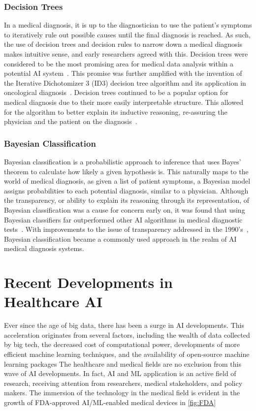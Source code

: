 \documentclass[a4paper]{article}
\begin{document}
\subsubsection{Decision Trees}
In a medical diagnosis, it is up to the diagnostician to use the patient's symptoms to iteratively rule out possible causes until the final diagnosis is reached. As such, the use of decision trees and decision rules to narrow down a medical diagnosis makes intuitive sense, and early researchers agreed with this. Decision trees were considered to be the most promising area for medical data analysis within a potential AI system~\cite{kononenko_machine_2001}. This promise was further amplified with the invention of the Iterative Dichotomizer 3 (ID3) decision tree algorithm and its application in oncological diagnosis~\cite{kononenko_machine_2001}. Decision trees continued to be a popular option for medical diagnosis due to their more easily interpretable structure. This allowed for the algorithm to better explain its inductive reasoning, re-assuring the physician and the patient on the diagnosis~\cite{kononenko_machine_2001}. 

\subsubsection{Bayesian Classification}
Bayesian classification is a probabilistic approach to inference that uses Bayes' theorem to calculate how likely a given hypothesis is. This naturally maps to the world of medical diagnosis, as given a list of patient symptoms, a Bayesian model assigns probabilities to each potential diagnosis, similar to a physician. Although the transparency, or ability to explain its reasoning through its representation, of Bayesian classification was a cause for concern early on, it was found that using Bayesian classifiers far outperformed other AI algorithms in medical diagnostic tests~\cite{kononenko_machine_2001}. With improvements to the issue of transparency addressed in the 1990's~\cite{kononenko_machine_2001}, Bayesian classification became a commonly used approach in the realm of AI medical diagnosis systems.  

\section{Recent Developments in Healthcare AI}
Ever since the age of big data, there has been a surge in AI developments. 
This acceleration originates from several factors, including the wealth of data collected by big tech, the decreased cost of computational power, developments of more efficient machine learning techniques, and the availability of open-source machine learning packages
The healthcare and medical fields are no exclusion from this wave of AI developments. 
In fact, AI and ML application is an active field of research, receiving attention from researchers, medical stakeholders, and policy makers.
The immersion of the technology in the medical field is evident in the growth of FDA-approved AI/ML-enabled medical devices in \autoref{fig:FDA} \cite{FDA_artificial_nodate}
\end{document}
